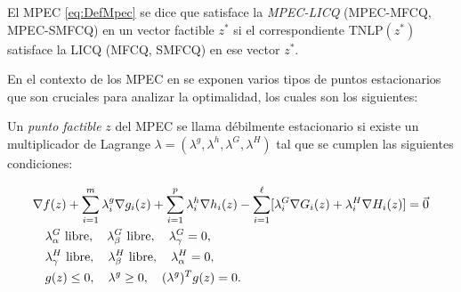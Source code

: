 \begin{definition}
El MPEC \eqref{eq:DefMpec} se dice que satisface la \textit{MPEC-LICQ} (MPEC-MFCQ, MPEC-SMFCQ) en un vector factible $z^*$ si el correspondiente TNLP$(z^*)$ satisface la LICQ (MFCQ, SMFCQ) en ese vector $z^*$.
\end{definition}
    

En el contexto de los MPEC en \cite{Flegel2003AFJ} se exponen varios tipos de puntos estacionarios que son cruciales para analizar la optimalidad, los cuales son los siguientes:
\begin{definition}
    Un \textit{punto factible} $z$ del MPEC se llama débilmente estacionario si existe un multiplicador de Lagrange $\lambda = (\lambda^g, \lambda^h, \lambda^G, \lambda^H)$ tal que se cumplen las siguientes condiciones:
    
\begin{align}
& \nabla f(z) + \sum_{i=1}^m \lambda_i^g\nabla g_i(z) + \sum_{i=1}^p \lambda_i^h\nabla h_i(z) - \sum_{i=1}^{\ell} [\lambda_i^G\nabla G_i(z) + \lambda_i^H\nabla H_i(z)] = \vec{0} \notag\\
    & \quad \begin{aligned}
        & \lambda_\alpha^G \text{ libre}, \quad \lambda_\beta^G \text{ libre}, \quad \lambda_\gamma^G = 0, \\
        & \lambda_\gamma^H \text{ libre}, \quad \lambda_\beta^H \text{ libre}, \quad \lambda_\alpha^H = 0, \\
        & g(z) \leq 0, \quad \lambda^g \geq 0, \quad (\lambda^g)^T g(z) = 0.
    \end{aligned} \\
& \label{eq:Definicion_punto_debilemente_estacionario} \notag
\end{align}
\end{definition}

